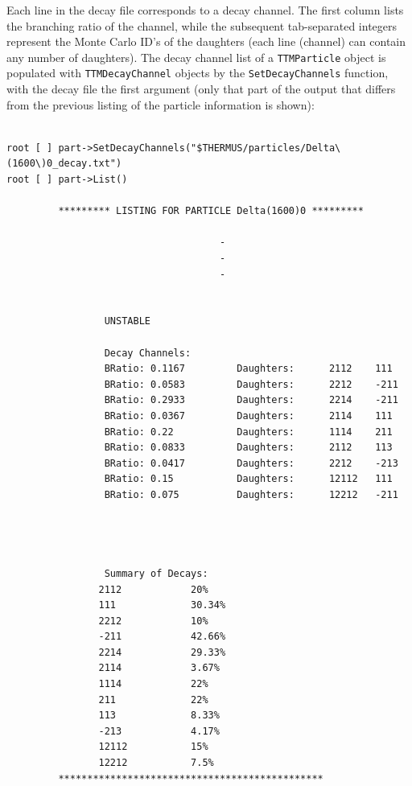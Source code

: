 \documentclass{elsarticle}
\begin{document}
Each line in the decay file corresponds to a decay channel.
The first column lists the branching ratio of the channel, while the 
subsequent tab-separated integers represent the Monte Carlo ID's of 
the daughters (each line (channel) can contain any number of daughters). 
The decay channel list of a \texttt{TTMParticle} object is populated 
with \texttt{TTMDecayChannel} objects by the 
\texttt{SetDecayChannels} function, 
with the decay file the first argument (only that part of the output that 
differs from the previous listing of the particle information is shown): 

\small
\begin{verbatim}

root [ ] part->SetDecayChannels("$THERMUS/particles/Delta\(1600\)0_decay.txt")
root [ ] part->List()

         ********* LISTING FOR PARTICLE Delta(1600)0 *********

                                     -
                                     -
                                     -


                 UNSTABLE

                 Decay Channels:
                 BRatio: 0.1167         Daughters:      2112    111
                 BRatio: 0.0583         Daughters:      2212    -211
                 BRatio: 0.2933         Daughters:      2214    -211
                 BRatio: 0.0367         Daughters:      2114    111
                 BRatio: 0.22           Daughters:      1114    211
                 BRatio: 0.0833         Daughters:      2112    113
                 BRatio: 0.0417         Daughters:      2212    -213
                 BRatio: 0.15           Daughters:      12112   111
                 BRatio: 0.075          Daughters:      12212   -211




                 Summary of Decays:
                2112            20%
                111             30.34%
                2212            10%
                -211            42.66%
                2214            29.33%
                2114            3.67%
                1114            22%
                211             22%
                113             8.33%
                -213            4.17%
                12112           15%
                12212           7.5%
         **********************************************

\end{verbatim}
\normalsize
\end{document}
